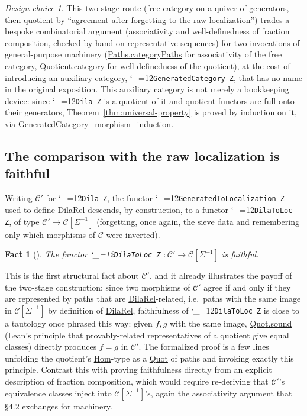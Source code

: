 \documentclass[11pt]{amsart}
\newcommand{\lc}[1]{\url{#1}}
\newcommand{\lcode}{\begingroup\catcode`\_=12\relax\lcodeInner}
\newcommand{\lcodeInner}[1]{\texttt{#1}\endgroup}
\theoremstyle{plain}
\newtheorem{fact}[theorem]{Fact}
\theoremstyle{definition}
\theoremstyle{remark}
\newtheorem*{designchoice}{Design choice}
\newcommand{\calC}{\mathcal C}
\begin{document}
\begin{designchoice}
This two-stage route (free category on a quiver of generators, then quotient by
``agreement after forgetting to the raw localization'') trades a bespoke combinatorial
argument (associativity and well-definedness of fraction composition, checked by hand on
representative sequences) for two invocations of general-purpose machinery
(\lc{Paths.categoryPaths}{} for associativity of the free category, \lc{Quotient.category}
for well-definedness of the quotient), at the cost of introducing an auxiliary category,
\lcode{GeneratedCategory Z}, that has no name in the original exposition. This auxiliary
category is not merely a bookkeeping device: since \lcode{Dila Z} is a quotient of it and
quotient functors are full onto their generators, Theorem~\ref{thm:universal-property} is
proved by induction on it, via \lc{GeneratedCategory\_morphism\_induction}.
\end{designchoice}

\subsection{The comparison with the raw localization is faithful}

Writing $\calC'$ for \lcode{Dila Z}, the functor \lcode{GeneratedToLocalization Z} used to define
\lc{DilaRel} descends, by construction, to a functor \lcode{DilaToLoc Z}, of type
$\calC' \to \calC[\Sigma^{-1}]$ (forgetting, once again, the sieve data and remembering only
which morphisms of $\calC$ were inverted).

\begin{fact}[{\citep[Fact~2.14]{Mayeux}}]
\label{fact:faithful-into-localization}
The functor \lcode{DilaToLoc Z} $: \calC' \to \calC[\Sigma^{-1}]$ is faithful.
\end{fact}

This is the first structural fact about $\calC'$, and it already illustrates the payoff of
the two-stage construction: since two morphisms of $\calC'$ agree if and only if they are
represented by paths that are \lc{DilaRel}-related, i.e.\ paths with the same image in
$\calC[\Sigma^{-1}]$ by definition of \lc{DilaRel}, faithfulness of
\lcode{DilaToLoc Z} is close to a tautology once phrased this way: given
$f, g$ with the same image, \lc{Quot.sound} (Lean's principle that provably-related
representatives of a quotient give equal classes) directly produces $f=g$ in $\calC'$. The
formalized proof is a few lines unfolding the quotient's \lc{Hom}-type as a \lc{Quot} of paths
and invoking exactly this principle. Contrast this with proving faithfulness directly from an
explicit description of fraction composition, which would require re-deriving that
$\calC'$'s equivalence classes inject into $\calC[\Sigma^{-1}]$'s, again the associativity
argument that \S 4.2 exchanges for machinery.
\end{document}

